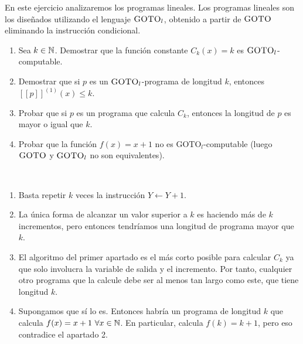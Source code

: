 \documentclass[twoside]{article}
\begin{document}
\begin{ejercicio}{15}
En este ejercicio analizaremos los programas lineales. Los programas lineales son
los diseñados utilizando el lenguaje $\textsc{GOTO}_l$, obtenido a partir de $\textsc{GOTO}$ eliminando la instrucción
condicional.
\begin{enumerate}
\item Sea $k\in \mathbb{N}$. Demostrar que la función constante $C_k(x) = k$ es $\textsc{GOTO}_l$-computable.
\item Demostrar que si $p$ es un $\textsc{GOTO}_l$-programa de longitud $k$, entonces $[[p]]^{(1)}(x) \leq k$.
\item Probar que si $p$ es un programa que calcula $C_k$, entonces la longitud de $p$ es mayor o igual
que $k$.
\item Probar que la función $f(x) = x + 1$ no es $\text{GOTO}_l$-computable (luego $\textsc{GOTO}$ y $\textsc{GOTO}_l$ no son
equivalentes).
\end{enumerate}
\end{ejercicio}
\begin{solucion}\
\begin{enumerate}
\item Basta repetir $k$ veces la instrucción $Y\leftarrow Y+1$.
\item La única forma de alcanzar un valor superior a $k$ es haciendo más de $k$ incrementos, pero entonces tendríamos una longitud de programa mayor que $k$. 
\item El algoritmo del primer apartado es el más corto posible para calcular $C_k$ ya que solo involucra la variable de salida y el incremento. Por tanto, cualquier otro programa que la calcule debe ser al menos tan largo como este, que tiene longitud $k$. 
\item Supongamos que sí lo es. Entonces habría un programa de longitud $k$ que calcula $f(x)=x+1\ \forall x\in\mathbb{N}$. En particular, calcula $f(k)=k+1$, pero eso contradice el apartado 2.
\end{enumerate}
\end{solucion}

\newpage
\end{document}
